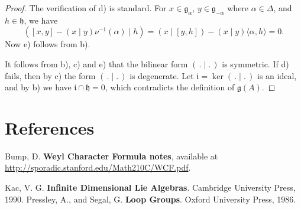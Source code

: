 \documentclass[12pt]{article}
\begin{document}
\begin{proof}
    The verification of d) is standard. For $x \in \mathfrak{g}_\alpha$, $y \in \mathfrak{g}_{-\alpha}$
    where $\alpha \in \Delta$, and $h \in \mathfrak{h}$, we have
    \[
        ([x,y] - (x \mid y)\nu^{-1}(\alpha) \mid h)
        = (x \mid [y,h]) - (x \mid y)\langle \alpha,h\rangle = 0.
    \]
    Now e) follows from b).

    It follows from b), c) and e) that the bilinear form $(\,.\mid.\,)$ is symmetric.
    If d) fails, then by c) the form $(\,.\mid.\,)$ is degenerate.
    Let $\mathfrak{i} = \ker(\,.\mid.\,)$ is an ideal, and by b) we have
    $\mathfrak{i}\cap \mathfrak{h}=0$, which contradicts the definition of $\mathfrak{g}(A)$.
\end{proof}

\section{References}
\begin{enumerate}
     Bump, D. \textbf{Weyl Character Formula notes}, available at \url{http://sporadic.stanford.edu/Math210C/WCF.pdf}.

     Kac, V. G. \textbf{Infinite Dimensional Lie Algebras}. Cambridge University Press, 1990.
     Pressley, A., and Segal, G. \textbf{Loop Groups}. Oxford University Press, 1986.
\end{enumerate}
\end{document}
